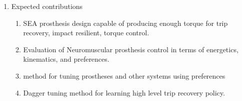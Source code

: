 \begin{enumerate}
    \item Expected contributions
    \begin{enumerate}
        \item SEA prosthesis design capable of producing enough torque for trip
        recovery, impact resilient, torque control.
        \item Evaluation of Neuromuscular prosthesis control in terms of
        energetics, kinematics, and preferences.
        \item method for tuning prostheses and other systems using preferences
        \item Dagger tuning method for learning high level trip recovery policy.
    \end{enumerate}
\end{enumerate}

